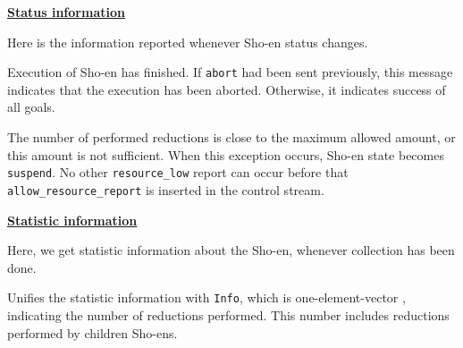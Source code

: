 \noindent\underline{\bf Status information}
\vspace{1ex}\par
Here is the information reported whenever Sho-en status changes.
\begin{itemize}

Execution of Sho-en has finished. If \verb|abort| had been sent previously,
this message indicates that the execution has been aborted. Otherwise,
it indicates success of all goals.

The number of performed reductions is close to the maximum allowed amount, or
this amount is not sufficient. When this exception occurs, Sho-en state becomes
\verb|suspend|. No other \verb|resource_low|
report can occur before that \verb|allow_resource_report|
is inserted in the control stream.

\end{itemize}
\vspace{1ex}

\noindent\underline{\bf Statistic information}
\vspace{1ex}\par
Here, we get statistic information about the Sho-en,
whenever collection has been done.
\begin{itemize}

Unifies the statistic information with \verb|Info|, which is one-element-vector
, indicating the number of reductions performed. This number includes
reductions performed by children Sho-ens.

\end{itemize}
\vspace{1ex}

